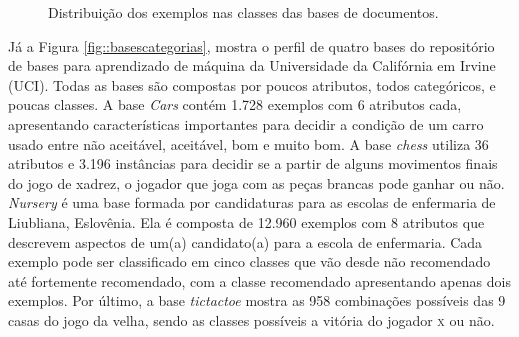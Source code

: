 \begin{figure}[!h]

\caption{Distribuição dos exemplos nas classes das bases de documentos.}
\label{fig::basesdoc}
\end{figure}

Já a Figura \ref{fig::basescategorias}, mostra o perfil de quatro bases do repositório de bases para aprendizado de máquina da Universidade da Califórnia em Irvine (\textsc{UCI}). Todas as bases são compostas por poucos atributos, todos categóricos, e poucas classes.
A base \textit{Cars} contém 1.728 exemplos com 6 atributos cada, apresentando características importantes para decidir a condição de um carro usado entre não aceitável, aceitável, bom e muito bom. A base \textit{chess} utiliza 36 atributos e 3.196 instâncias para decidir se a partir de alguns movimentos finais do jogo de xadrez, o jogador que joga com as peças brancas pode ganhar ou não. \textit{Nursery} é uma base formada por candidaturas para as escolas de enfermaria de Liubliana, Eslovênia. Ela é composta de 12.960 exemplos com 8 atributos que descrevem aspectos de um(a) candidato(a) para a escola de enfermaria. Cada exemplo pode ser classificado em cinco classes que vão desde não recomendado até fortemente recomendado, com a classe recomendado apresentando apenas dois exemplos.
Por último, a base \textit{tictactoe} mostra as 958 combinações possíveis das 9 casas do jogo da velha, sendo as classes possíveis a vitória do jogador \textsc{x} ou não.

